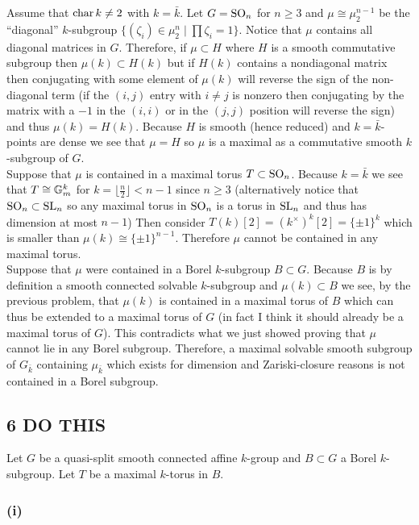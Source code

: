 \documentclass[12pt]{article}
\begin{document}
Assume that $\operatorname{\mathrm{char}}{k} \neq 2$ with $k = \bar{k}$. Let $G = \mathrm{SO}_n$ for $n \ge 3$ and $\mu \cong \mu_2^{n-1}$ be the ``diagonal'' $k$-subgroup $\{(\zeta_i) \in \mu_2^n \mid \prod \zeta_i = 1 \}$. Notice that $\mu$ contains all diagonal matrices in $G$. Therefore, if $\mu \subset H$ where $H$ is a smooth commutative subgroup then $\mu(k) \subset H(k)$ but if $H(k)$ contains a nondiagonal matrix then conjugating with some  element of $\mu(k)$ will reverse the sign of the non-diagonal term (if the $(i,j)$ entry with $i \neq j$ is nonzero then conjugating by the matrix with a $-1$ in the $(i,i)$ or in the $(j,j)$ position will reverse the sign) and thus $\mu(k) = H(k)$. Because $H$ is smooth (hence reduced) and $k = \bar{k}$-points are dense we see that $\mu = H$ so $\mu$ is a maximal as a commutative smooth $k$-subgroup of $G$.
\bigskip\\
Suppose that $\mu$ is contained in a maximal torus $T \subset \mathrm{SO}_n$. Because $k = \bar{k}$ we see that $T \cong \mathbb{G}_m^{k}$ for $k = \lfloor \frac{n}{2} \rfloor < n-1$ since $n \ge 3$ (alternatively notice that $\mathrm{SO}_n \subset \mathrm{SL}_n$ so any maximal torus in $\mathrm{SO}_n$ is a torus in $\mathrm{SL}_n$ and thus has dimension at most $n-1$) Then consider $T(k)[2] = (k^\times)^{k}[2] = \{ \pm 1 \}^k$ which is smaller than $\mu(k) \cong \{ \pm 1 \}^{n-1}$. Therefore $\mu$ cannot be contained in any maximal torus.
\bigskip\\
Suppose that $\mu$ were contained in a Borel $k$-subgroup $B \subset G$. Because $B$ is by definition a smooth connected solvable $k$-subgroup and $\mu(k) \subset B$ we see, by the previous problem, that $\mu(k)$ is contained in a maximal torus of $B$ which can thus be extended to a maximal torus of $G$ (in fact I think it should already be a maximal torus of $G$). This contradicts what we just showed proving that $\mu$ cannot lie in any Borel subgroup. Therefore, a maximal solvable smooth subgroup of $G_{\bar{k}}$ containing $\mu_{\bar{k}}$ which exists for dimension and Zariski-closure reasons is not contained in a Borel subgroup. 

\subsection{6 DO THIS}

Let $G$ be a quasi-split smooth connected affine $k$-group and $B \subset G$ a Borel $k$-subgroup. Let $T$ be a maximal $k$-torus in $B$.

\subsubsection{(i)}
\end{document}
